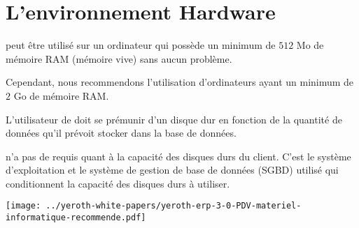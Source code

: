\chapter{L'environnement Hardware}\label{chap:environement-materiel-requis}



\yeren peut \^etre utilis\'e sur un ordinateur qui
poss\`ede un minimum de $512$ Mo de m\'emoire RAM
(m\'emoire vive) sans aucun probl\`eme.

Cependant, nous recommendons l'utilisation d'ordinateurs
ayant un minimum de $2$ Go de m\'emoire RAM.



L'utilisateur de \yeren doit se pr\'emunir d'un disque
dur en fonction de la quantit\'e de donn\'ees qu'il
pr\'evoit stocker dans la base de donn\'ees.

\yeren n'a pas de requis quant \`a la capacit\'e
des disques durs du client. C'est le syst\`eme d'exploitation
et le syst\`eme de gestion de base de donn\'ees (SGBD)
utilis\'e qui conditionnent la capacit\'e des disques
durs \`a utiliser.


\newpage


\texttt{[image: ../yeroth-white-papers/yeroth-erp-3-0-PDV-materiel-informatique-recommende.pdf]}
